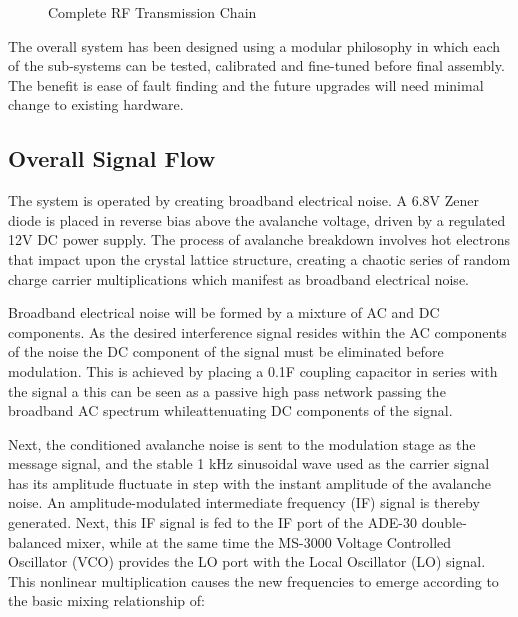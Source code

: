 \documentclass[12pt,a4paper]{report}
\begin{document}
\begin{figure}[htbp]
			\caption{Complete RF Transmission Chain}
			\label{fig:rf_chain}
		\end{figure}
		
	The overall system has been designed using a modular philosophy in which each of the sub-systems can be tested, calibrated and fine-tuned before final assembly. The benefit is ease of fault finding and the future upgrades will need minimal change to existing hardware.
	
	\subsection{Overall Signal Flow}
	The system is operated by creating broadband electrical noise. A 6.8V Zener diode is placed in reverse bias above the avalanche voltage, driven by a regulated 12V DC power supply. The process of avalanche breakdown involves hot electrons that impact upon the crystal lattice structure, creating a chaotic series of random charge carrier multiplications which manifest as broadband electrical noise. 
	\vspace{0.5cm}
	
	Broadband electrical noise will be formed by a mixture of AC and DC components. 
	As the desired interference signal resides within the AC components of the noise the DC component of the signal must be eliminated before modulation. This is achieved by placing a 0.1F coupling capacitor in series with the signal a this can be seen as a passive high pass network passing the broadband AC spectrum whileattenuating DC components of the signal.
	\vspace{0.5cm}
	
	Next, the conditioned avalanche noise is sent to the modulation stage as the message signal, and the stable 1 kHz sinusoidal wave used as the carrier signal has its amplitude fluctuate in step with the instant amplitude of the avalanche noise. An amplitude-modulated intermediate frequency (IF) signal is thereby generated. Next, this IF signal is fed to the IF port of the ADE-30 double-balanced mixer, while at the same time the MS-3000 Voltage Controlled Oscillator (VCO) provides the LO port with the Local Oscillator (LO) signal. This nonlinear multiplication causes the new frequencies to emerge according to the basic mixing relationship of:
\end{document}
